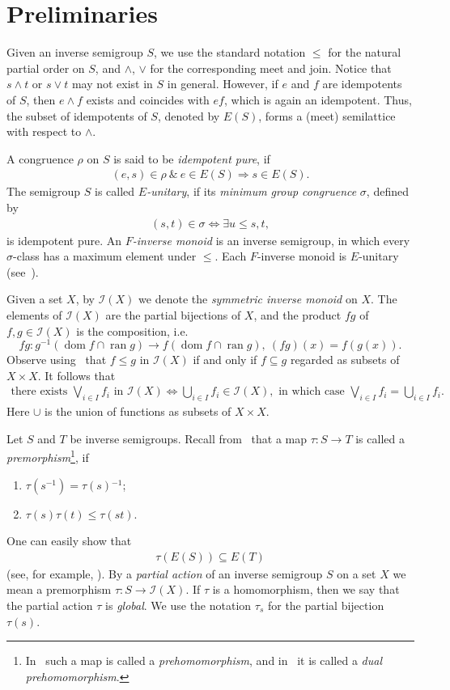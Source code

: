 \documentclass[reqno]{amsart}
\theoremstyle{definition}
\renewcommand{\iff}{\Leftrightarrow}
\newcommand{\impl}{\Rightarrow}
\newcommand{\cI}[1]{\mathcal I{(#1)}}
\newcommand{\dom}[1]{\operatorname{\mathrm{dom}}{#1}}
\newcommand{\ran}[1]{\operatorname{\mathrm{ran}}{#1}}
\newcommand{\m}{{}^{-1}}
\newcommand{\0}{\theta}
\newcommand{\sst}{\subseteq}
\newcommand{\mt}{\wedge}
\newcommand{\jn}{\vee}
\newcommand{\Jn}{\bigvee}
\begin{document}
\section{Preliminaries}

Given an inverse semigroup $S$, we use the standard notation $\le$ for the natural partial order on $S$, and $\mt$, $\jn$ for the corresponding meet and join. Notice that $s\mt t$ or $s\jn t$ may not exist in $S$ in general. However, if $e$ and $f$ are idempotents of $S$, then $e\mt f$ exists and coincides with $ef$, which is again an idempotent. Thus, the subset of idempotents of $S$, denoted by $E(S)$, forms a (meet) semilattice with respect to $\mt$. 

A congruence $\rho$ on $S$ is said to be {\it idempotent pure}, if 
\begin{align*}
(e,s)\in\rho\ \&\ e\in E(S)\impl s\in E(S).
\end{align*}
The semigroup $S$ is called {\it $E$-unitary}, if its \emph{minimum group congruence} $\sigma$, defined by 
\begin{align*}
(s,t)\in\sigma\iff\exists u\le s,t,
\end{align*}
is idempotent pure. An {\it $F$-inverse monoid} is an inverse semigroup, in which every $\sigma$-class has a maximum element under $\le$. Each $F$-inverse monoid is $E$-unitary (see~\cite[Proposition 7.1.3]{Lawson}).

Given a set $X$, by $\cI X$ we denote the \emph{symmetric inverse monoid} on $X$. The elements of $\cI X$ are the partial bijections of $X$, and the product $fg$ of $f,g\in\cI X$ is the composition, i.e.
$$
fg:g\m(\dom f\cap\ran g)\to f(\dom f\cap\ran g),\ (fg)(x)=f(g(x)).
$$
Observe using~\cite[Proposition 1.1.4 (3)]{Lawson} that $f\le g$ in $\cI X$ if and only if $f\sst g$ regarded as subsets of $X\times X$. It follows that
\begin{align}\label{exists-Join-f_i-in-I(X)}
\mbox{there exists } \Jn_{i\in I}f_i\mbox{ in }\cI X\iff \bigcup_{i\in I} f_i\in \cI X,\mbox{ in which case }\Jn_{i\in I}f_i=\bigcup_{i\in I} f_i.
\end{align}
Here $\cup$ is the union of functions as subsets of $X\times X$.

Let $S$ and $T$ be inverse semigroups. Recall from~\cite{KL} that a map $\tau:S\to T$ is called a {\it premorphism}\footnote{In~\cite{Petrich} such a map is called a {\it prehomomorphism}, and in~\cite{LMS,St2001} it is called a {\it dual prehomomorphism}.}, if
\begin{enumerate}
	\item $\tau(s\m)=\tau(s)\m$;\label{tau(s-inv)=tau(s)-inv}
	\item $\tau(s)\tau(t)\le\tau(st)$.\label{tau(s)tau(t)<=tau(st)}
\end{enumerate}
One can easily show that 
\begin{align}\label{tau(E(S))-sst-E(T)}
\tau(E(S))\subseteq E(T)
\end{align}
(see, for example, \cite{St2001}). By a {\it partial action} of an inverse semigroup $S$ on a set $X$ we mean a premorphism $\tau:S\to\cI X$. If $\tau$ is a homomorphism, then we say that the partial action $\tau$ is {\it global}. We use the notation $\tau_s$ for the partial bijection $\tau(s)$. 
\end{document}
